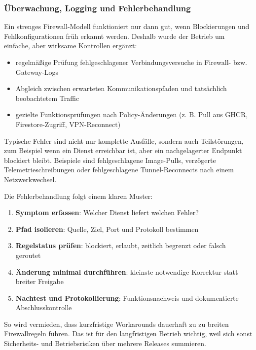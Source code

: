 \subsubsection{Überwachung, Logging und Fehlerbehandlung}

Ein strenges Firewall-Modell funktioniert nur dann gut, wenn Blockierungen und Fehlkonfigurationen früh erkannt werden. Deshalb wurde der Betrieb um einfache, aber wirksame Kontrollen ergänzt:

\begin{itemize}
    \item regelmäßige Prüfung fehlgeschlagener Verbindungsversuche in Firewall- bzw. Gateway-Logs
    \item Abgleich zwischen erwarteten Kommunikationspfaden und tatsächlich beobachtetem Traffic
    \item gezielte Funktionsprüfungen nach Policy-Änderungen (z. B. Pull aus GHCR, Firestore-Zugriff, VPN-Reconnect)
\end{itemize}

Typische Fehler sind nicht nur komplette Ausfälle, sondern auch Teilstörungen, zum Beispiel wenn ein Dienst erreichbar ist, aber ein nachgelagerter Endpunkt blockiert bleibt. Beispiele sind fehlgeschlagene Image-Pulls, verzögerte Telemetrieschreibungen oder fehlgeschlagene Tunnel-Reconnects nach einem Netzwerkwechsel.

Die Fehlerbehandlung folgt einem klaren Muster:

\begin{enumerate}
    \item \textbf{Symptom erfassen}: Welcher Dienst liefert welchen Fehler?
    \item \textbf{Pfad isolieren}: Quelle, Ziel, Port und Protokoll bestimmen
    \item \textbf{Regelstatus prüfen}: blockiert, erlaubt, zeitlich begrenzt oder falsch geroutet
    \item \textbf{Änderung minimal durchführen}: kleinste notwendige Korrektur statt breiter Freigabe
    \item \textbf{Nachtest und Protokollierung}: Funktionsnachweis und dokumentierte Abschlusskontrolle
\end{enumerate}

So wird vermieden, dass kurzfristige Workarounds dauerhaft zu zu breiten Firewallregeln führen. Das ist für den langfristigen Betrieb wichtig, weil sich sonst Sicherheits- und Betriebsrisiken über mehrere Releases summieren.

